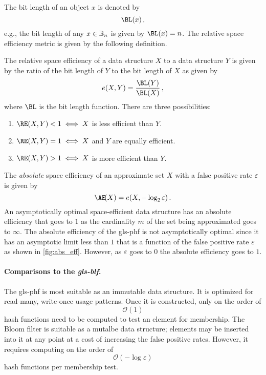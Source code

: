 \documentclass[ ../main.tex]{subfiles}
\begin{document}
The bit length of an object $x$ is denoted by
\begin{equation}
    \BL(x)\,,
\end{equation}
e.g., the bit length of any $x \in \mathbb{B}_n$ is given by $\BL(x) = n$. The relative space efficiency metric is given by the following definition.
\begin{definition}
The relative space efficiency of a data structure $X$ to a data structure $Y$ is given by the ratio of the bit length of $Y$ to the bit length of $X$ as given by
\begin{equation}
    e(X,Y)=\frac{\BL(Y)}{\BL(X)}\,,
\end{equation}
where $\BL$ is the bit length function. There are three possibilities:
\begin{enumerate}
    \item $\RE(X,Y) < 1 \iff X$ is less efficient than $Y$.
    \item $\RE(X,Y) = 1 \iff X$ and $Y$ are equally efficient.
    \item $\RE(X,Y) > 1 \iff X$ is more efficient than $Y$.
\end{enumerate}
\end{definition}

The \emph{absolute} space efficiency of an approximate set $X$ with a false positive rate $\varepsilon$ is given by
\begin{equation}
    \AE\!(X) = e(X,-\log_2 \varepsilon)\,.
\end{equation}
An asymptotically optimal space-efficient data structure has an absolute efficiency that goes to $1$ as the cardinality $m$ of the set being approximated goes to $\infty$. The absolute efficiency of the \gls{gls-phf} is not asymptotically optimal since it has an asymptotic limit less than $1$ that is a function of the false positive rate $\varepsilon$ as shown in \cref{fig:abs_eff}. However, as $\varepsilon$ goes to $0$ the absolute efficiency goes to $1$.

\paragraph{Comparisons to the \emph{\gls{gls-blf}}.}
The \gls{gls-phf} is most suitable as an immutable data structure. It is optimized for read-many, write-once usage patterns. Once it is constructed, only on the order of
\begin{equation}
    \mathcal{O} \left( 1 \right)
\end{equation}
hash functions need to be computed to test an element for membership. The Bloom filter is suitable as a mutalbe data structure; elements may be inserted into it at any point at a cost of increasing the false positive rates. However, it requires computing on the order of
\begin{equation}
    \mathcal{O}\left(-\log \varepsilon\right)
\end{equation}
hash functions per membership test.
\end{document}

